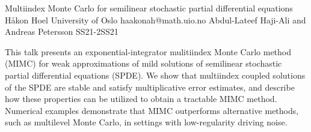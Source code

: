 \begin{talk}
\end{talk}

\begin{talk}
  {Multiindex Monte Carlo for semilinear stochastic partial differential equations}%
  {H{\aa}kon Hoel}%
  {University of Oslo}%
  {haakonah@math.uio.no}%
  {Abdul-Lateef Haji-Ali and Andreas Petersson}%
{}{}{SS21-2}{SS21}

			
This talk presents an exponential-integrator mulitiindex Monte Carlo method (MIMC) for weak approximations of mild solutions of semilinear stochastic partial differential equations (SPDE). We show that multiindex coupled solutions of the SPDE are stable and satisfy multiplicative error estimates, and describe how these properties can be utilized to obtain a tractable MIMC method. Numerical examples demonstrate that MIMC outperforms alternative methods, such as multilevel Monte Carlo, in settings with low-regularity driving noise.  

\end{talk}

